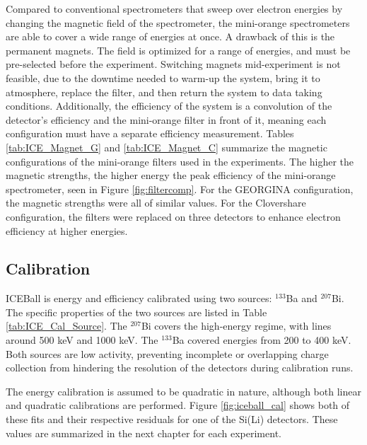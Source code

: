 Compared to conventional spectrometers that sweep over electron energies by changing the magnetic field of the spectrometer, the mini-orange spectrometers are able to cover a wide range of energies at once. A drawback of this is the permanent magnets. The field is optimized for a range of energies, and must be pre-selected before the experiment. Switching magnets mid-experiment is not feasible, due to the downtime needed to warm-up the system, bring it to atmosphere, replace the filter, and then return the system to data taking conditions. Additionally, the efficiency of the system is a convolution of the detector's efficiency and the mini-orange filter in front of it, meaning each configuration must have a separate efficiency measurement. Tables \ref{tab:ICE_Magnet_G} and \ref{tab:ICE_Magnet_C} summarize the magnetic configurations of the mini-orange filters used in the experiments. The higher the magnetic strengths, the higher energy the peak efficiency of the mini-orange spectrometer, seen in Figure \ref{fig:filtercomp}. For the GEORGINA configuration, the magnetic strengths were all of similar values. For the Clovershare configuration, the filters were replaced on three detectors to enhance electron efficiency at higher energies.







\subsection{Calibration}

ICEBall is energy and efficiency calibrated using two sources: $^{133}$Ba and $^{207}$Bi. The specific properties of the two sources are listed in Table \ref{tab:ICE_Cal_Source}. The $^{207}$Bi covers the high-energy regime, with lines around 500 keV and 1000 keV. The $^{133}$Ba covered energies from 200 to 400 keV. Both sources are low activity, preventing incomplete or overlapping charge collection from hindering the resolution of the detectors during calibration runs. 



The energy calibration is assumed to be quadratic in nature, although both linear and quadratic calibrations are performed. Figure \ref{fig:iceball_cal} shows both of these fits and their respective residuals for one of the Si(Li) detectors. These values are summarized in the next chapter for each experiment.

